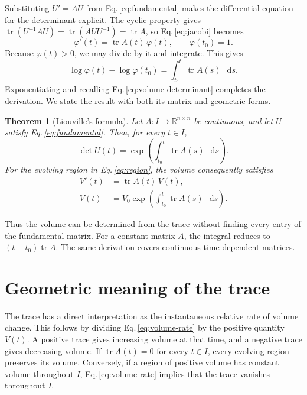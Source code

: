 \documentclass[a4paper,11pt]{article}
\newcommand{\R}{\mathbb{R}}
\newcommand{\dd}{\mathop{}\!\mathrm{d}}
\DeclareMathOperator{\tr}{tr}
\numberwithin{equation}{section}
\newtheorem{theorem}{Theorem}[section]
\begin{document}
Substituting $U'=AU$ from Eq.\,\eqref{eq:fundamental} makes the differential
equation for the determinant explicit. The cyclic property gives
$\tr(U^{-1}AU)=\tr(AUU^{-1})=\tr A$, so Eq.\,\eqref{eq:jacobi} becomes
\begin{equation}
  \varphi'(t)=\tr A(t)\,\varphi(t),
  \qquad \varphi(t_0)=1.
  \label{eq:scalar-determinant}
\end{equation}
Because $\varphi(t)>0$, we may divide by it and integrate. This gives
\begin{equation}
  \log\varphi(t)-\log\varphi(t_0)
  =\int_{t_0}^{t}\tr A(s)\,\dd s.
  \label{eq:log-determinant}
\end{equation}
Exponentiating and recalling Eq.\,\eqref{eq:volume-determinant} completes
the derivation. We state the result with both its matrix and geometric forms.

\begin{theorem}[Liouville's formula]
\label{thm:liouville}
Let $A:I\to\R^{n\times n}$ be continuous, and let $U$ satisfy
Eq.\,\eqref{eq:fundamental}. Then, for every $t\in I$,
\begin{equation}
  \det U(t)=\exp\!\left(\int_{t_0}^{t}\tr A(s)\,\dd s\right).
  \label{eq:liouville}
\end{equation}
For the evolving region in Eq.\,\eqref{eq:region}, the volume consequently
satisfies
\begin{subequations}\label{eq:volume-law}
\begin{align}
  V'(t)&=\tr A(t)\,V(t),\label{eq:volume-rate}\\
  V(t)&=V_0\exp\!\left(\int_{t_0}^{t}\tr A(s)\,\dd s\right).
  \label{eq:volume-integrated}
\end{align}
\end{subequations}
\end{theorem}

Thus the volume can be determined from the trace without finding every
entry of the fundamental matrix. For a constant matrix $A$, the integral
reduces to $(t-t_0)\tr A$. The same derivation covers continuous
time-dependent matrices.

\section{Geometric meaning of the trace}
\label{sec:geometry}

The trace has a direct interpretation as the instantaneous relative rate
of volume change. This follows by dividing Eq.\,\eqref{eq:volume-rate}
by the positive quantity $V(t)$. A positive trace gives increasing volume
at that time, and a negative trace gives decreasing volume. If
$\tr A(t)=0$ for every $t\in I$, every evolving region preserves its
volume. Conversely, if a region of positive volume has constant volume
throughout $I$, Eq.\,\eqref{eq:volume-rate} implies that the trace vanishes
throughout $I$.
\end{document}
